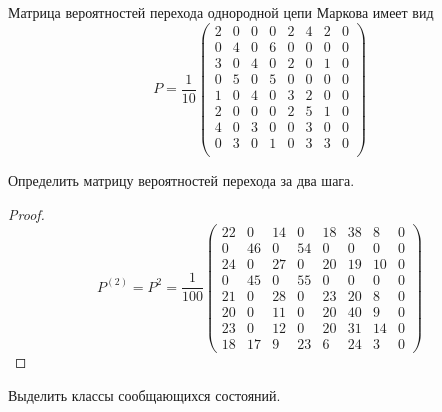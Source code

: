 
\renewcommand*{\proofname}{Решение}
Матрица вероятностей перехода однородной цепи Маркова имеет вид
\[
P = \frac{1}{10}\begin{pmatrix}
    2 & 0 & 0 & 0 & 2 & 4 & 2 & 0 \\
    0 & 4 & 0 & 6 & 0 & 0 & 0 & 0 \\
    3 & 0 & 4 & 0 & 2 & 0 & 1 & 0 \\
    0 & 5 & 0 & 5 & 0 & 0 & 0 & 0 \\
    1 & 0 & 4 & 0 & 3 & 2 & 0 & 0 \\
    2 & 0 & 0 & 0 & 2 & 5 & 1 & 0 \\
    4 & 0 & 3 & 0 & 0 & 3 & 0 & 0 \\
    0 & 3 & 0 & 1 & 0 & 3 & 3 & 0 \\
\end{pmatrix}
\]

\begin{problem}
Определить матрицу вероятностей перехода за два шага.
\end{problem}

\begin{proof}
\[
P^{(2)} = P^2 = \frac{1}{100}\begin{pmatrix}
    22 & 0  & 14 & 0  & 18 & 38 & 8  & 0 \\
    0  & 46 & 0  & 54 & 0  & 0  & 0  & 0 \\
    24 & 0  & 27 & 0  & 20 & 19 & 10 & 0 \\
    0  & 45 & 0  & 55 & 0  & 0  & 0  & 0 \\
    21 & 0  & 28 & 0  & 23 & 20 & 8  & 0 \\
    20 & 0  & 11 & 0  & 20 & 40 & 9  & 0 \\
    23 & 0  & 12 & 0  & 20 & 31 & 14 & 0 \\
    18 & 17 & 9  & 23 & 6  & 24 & 3  & 0
\end{pmatrix}
\]
\end{proof}

\begin{problem}
Выделить классы сообщающихся состояний.
\end{problem}

